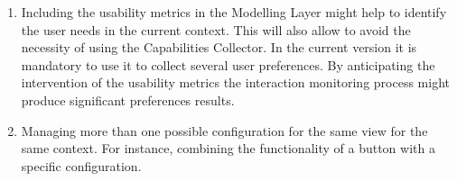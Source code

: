\begin{enumerate}[label=\alph*)]
  \inputminted[linenos=true, fontsize=\footnotesize, frame=lines]{java}{6_conclusion/api_adaptation.java}

  \item Including the usability metrics in the Modelling Layer might help to
  identify the user needs in the current context. This will also allow to avoid
  the necessity of using the Capabilities Collector. In the current version it
  is mandatory to use it to collect several user preferences. By anticipating
  the intervention of the usability metrics the interaction monitoring process
  might produce significant preferences results.
  
  \item Managing more than one possible configuration for the same view for
  the same context. For instance, combining the functionality of a button with
  a specific configuration.
\end{enumerate}